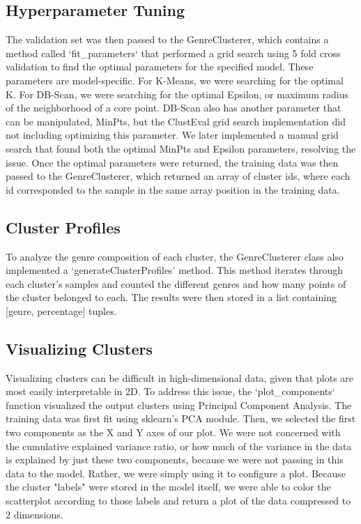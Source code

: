 \documentclass[conference]{IEEEtran}
\begin{document}
\subsection{Hyperparameter Tuning}
The validation set was then passed to the GenreClusterer, which contains a method called `fit\_parameters` that performed a grid search using 5 fold cross validation to find the optimal parameters for the specified model. These parameters are model-specific. For K-Means, we were searching for the optimal K. For DB-Scan, we were searching for the optimal Epsilon, or maximum radius of the neighborhood of a core point. DB-Scan also has another parameter that can be manipulated, MinPts, but the ClustEval grid search implementation did not including optimizing this parameter. We later implemented a manual grid search that found both the optimal MinPts and Epsilon parameters, resolving the issue. Once the optimal parameters were returned, the training data was then passed to the GenreClusterer, which returned an array of cluster ids, where each id corresponded to the sample in the same array position in the training data.

\subsection{Cluster Profiles}
To analyze the genre composition of each cluster, the GenreClusterer class also implemented a ‘generateClusterProfiles’ method. This method iterates through each cluster's samples and counted the different genres and how many points of the cluster belonged to each. The results were then stored in a list containing [genre, percentage] tuples. 

\subsection{Visualizing Clusters}
Visualizing clusters can be difficult in high-dimensional data, given that plots are most easily interpretable in 2D. To address this issue, the `plot\_components` function visualized the output clusters using Principal Component Analysis. The training data was first fit using sklearn's PCA module. Then, we selected the first two components as the X and Y axes of our plot. We were not concerned with the cumulative explained variance ratio, or how much of the variance in the data is explained by just these two components, because we were not passing in this data to the model. Rather, we were simply using it to configure a plot. Because the cluster "labels" were stored in the model itself, we were able to color the scatterplot according to those labels and return a plot of the data compressed to 2 dimensions.
\end{document}
